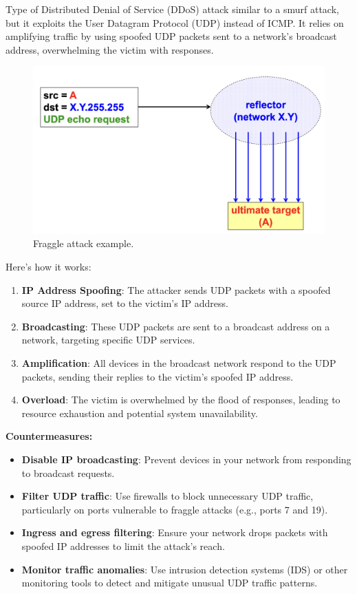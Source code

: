\begin{multicols}{2}
    Type of Distributed Denial of Service (DDoS) attack similar to a smurf attack, but it exploits the User Datagram Protocol (UDP) instead of ICMP. It relies on amplifying traffic by using spoofed UDP packets sent to a network’s broadcast address, overwhelming the victim with responses.

\columnbreak

    \begin{figure}[H]
        \centering
        \includegraphics[width=0.5\linewidth]{Images/NetSec/fraggle_attack.png}
        \caption{Fraggle attack example.}
    \end{figure}
\end{multicols}

Here’s how it works:
\begin{enumerate}
\item \textbf{IP Address Spoofing}: The attacker sends UDP packets with a spoofed source IP address, set to the victim’s IP address.
\item \textbf{Broadcasting}: These UDP packets are sent to a broadcast address on a network, targeting specific UDP services.
\item \textbf{Amplification}: All devices in the broadcast network respond to the UDP packets, sending their replies to the victim’s spoofed IP address.
\item \textbf{Overload}: The victim is overwhelmed by the flood of responses, leading to resource exhaustion and potential system unavailability.
\end{enumerate}

\textbf{Countermeasures:}
\begin{itemize}
\item \textbf{Disable IP broadcasting}: Prevent devices in your network from responding to broadcast requests.
\item \textbf{Filter UDP traffic}: Use firewalls to block unnecessary UDP traffic, particularly on ports vulnerable to fraggle attacks (e.g., ports 7 and 19).
\item \textbf{Ingress and egress filtering}: Ensure your network drops packets with spoofed IP addresses to limit the attack’s reach.
\item \textbf{Monitor traffic anomalies}: Use intrusion detection systems (IDS) or other monitoring tools to detect and mitigate unusual UDP traffic patterns.
\end{itemize}

